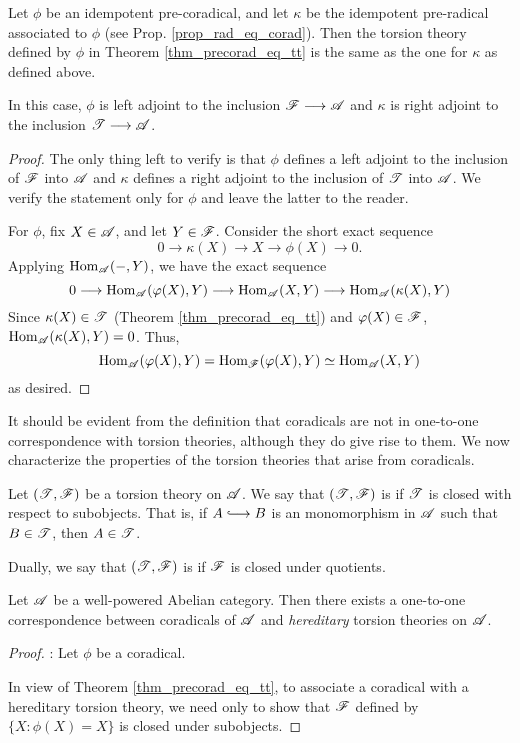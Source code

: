 \begin{cor}\label{cor_tt_ref_and_coref}
Let $\phi$ be an idempotent pre-coradical, and let $\kappa$ be the 
idempotent pre-radical associated to $\phi$ (see Prop. 
\ref{prop_rad_eq_corad}). Then the torsion theory defined by $\phi$
in Theorem \ref{thm_precorad_eq_tt} is the same as the one for
$\kappa$ as defined above.

In this case, $\phi$ is left adjoint to the inclusion $\mathscr{F} \longrightarrow 
\mathscr{A}$ and $\kappa$ is right adjoint to the inclusion $\mathscr{T} 
\longrightarrow \mathscr{A}$.
\end{cor}
\begin{proof}
The only thing left to verify is that $\phi$ defines a left 
adjoint to the inclusion of $\mathscr{F}$ into $\mathscr{A}$ and $\kappa$ 
defines a right adjoint to the inclusion of $\mathscr{T}$ into 
$\mathscr{A}$. We verify the statement only for $\phi$ and leave the 
latter to the reader.  

For $\phi$, fix $X \in \mathscr{A}$, and let $Y \in \mathscr{F}$. 
Consider the short exact sequence
\[
0 \to \kappa(X) \to X \to \phi(X) \to 0.
\]
Applying $\mathrm{Hom}_{\mathscr{A}}(-, Y)$, we have the exact sequence
\[
0 \longrightarrow \mathrm{Hom}_{\mathscr{A}}(\varphi(X), Y) \longrightarrow \mathrm{Hom}_{\mathscr{A}}(X, Y) \longrightarrow
\mathrm{Hom}_{\mathscr{A}}(\kappa(X), Y)
\]
Since $\kappa(X) \in \mathscr{T}$ (Theorem 
\ref{thm_precorad_eq_tt}) and $\varphi(X) \in \mathscr{F}$, 
$\mathrm{Hom}_{\mathscr{A}}(\kappa(X), Y) = 0$. Thus,
\[
\mathrm{Hom}_{\mathscr{A}}(\varphi(X), Y) = \mathrm{Hom}_{\mathscr{F}}(\varphi(X), Y) \simeq 
   \mathrm{Hom}_{\mathscr{A}}(X, Y)
\]
as desired.
\end{proof}

It should be evident from the definition that coradicals are not
in one-to-one correspondence with torsion theories, although they
do give rise to them. We now characterize the properties of the 
torsion theories that arise from coradicals.

\begin{defn}
Let $(\mathscr{T}, \mathscr{F})$ be a torsion theory on $\mathscr{A}$. We say 
that $(\mathscr{T}, \mathscr{F})$ is  if $\mathscr{T}$ is 
closed with respect to subobjects. That is, if $A \into B$ is an 
monomorphism in $\mathscr{A}$ such that $B \in \mathscr{T}$, then $A \in 
\mathscr{T}$.

Dually, we say that $(\mathscr{T}, \mathscr{F})$ is  if
$\mathscr{F}$ is closed under quotients.
\end{defn}

\begin{thm}\label{thm_corad_equiv_htt}
Let $\mathscr{A}$ be a well-powered Abelian category. Then there 
exists a one-to-one correspondence between coradicals of $\mathscr{A}$ 
and \emph{hereditary} torsion theories on $\mathscr{A}$.
\end{thm}
\begin{proof}

 : Let 
$\phi$ be a coradical.

In view of Theorem \ref{thm_precorad_eq_tt}, to associate a 
coradical with a hereditary torsion theory, we need only to show
that $\mathscr{F}$ defined by $\{X : \phi(X) = X\}$ is closed under
subobjects.
\end{proof}

